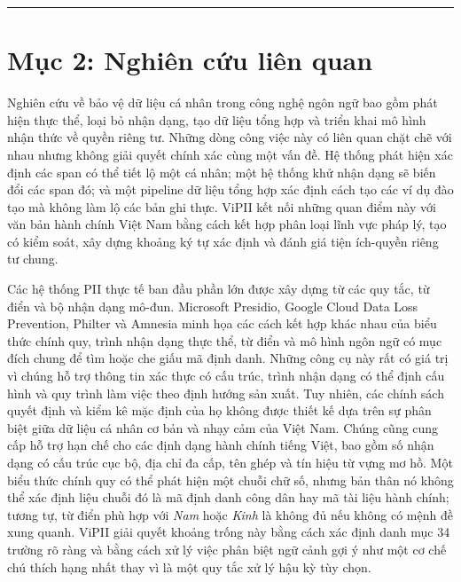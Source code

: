 \documentclass[
  11pt,
  a4paper,
]{article}
\begin{document}
\begin{center}\rule{0.5\linewidth}{0.5pt}\end{center}

\section{Mục 2: Nghiên cứu liên
quan}\label{mux1ee5c-2-nghiuxean-cux1ee9u-liuxean-quan}

Nghiên cứu về bảo vệ dữ liệu cá nhân trong công nghệ ngôn ngữ bao gồm
phát hiện thực thể, loại bỏ nhận dạng, tạo dữ liệu tổng hợp và triển
khai mô hình nhận thức về quyền riêng tư. Những dòng công việc này có
liên quan chặt chẽ với nhau nhưng không giải quyết chính xác cùng một
vấn đề. Hệ thống phát hiện xác định các span có thể tiết lộ một cá nhân;
một hệ thống khử nhận dạng sẽ biến đổi các span đó; và một pipeline dữ
liệu tổng hợp xác định cách tạo các ví dụ đào tạo mà không làm lộ các
bản ghi thực. ViPII kết nối những quan điểm này với văn bản hành chính
Việt Nam bằng cách kết hợp phân loại lĩnh vực pháp lý, tạo có kiểm soát,
xây dựng khoảng ký tự xác định và đánh giá tiện ích-quyền riêng tư
chung.

Các hệ thống PII thực tế ban đầu phần lớn được xây dựng từ các quy tắc,
từ điển và bộ nhận dạng mô-đun. Microsoft Presidio, Google Cloud Data
Loss Prevention, Philter và Amnesia minh họa các cách kết hợp khác nhau
của biểu thức chính quy, trình nhận dạng thực thể, từ điển và mô hình
ngôn ngữ có mục đích chung để tìm hoặc che giấu mã định danh. Những công
cụ này rất có giá trị vì chúng hỗ trợ thông tin xác thực có cấu trúc,
trình nhận dạng có thể định cấu hình và quy trình làm việc theo định
hướng sản xuất. Tuy nhiên, các chính sách quyết định và kiểm kê mặc định
của họ không được thiết kế dựa trên sự phân biệt giữa dữ liệu cá nhân cơ
bản và nhạy cảm của Việt Nam. Chúng cũng cung cấp hỗ trợ hạn chế cho các
định dạng hành chính tiếng Việt, bao gồm số nhận dạng có cấu trúc cục
bộ, địa chỉ đa cấp, tên ghép và tín hiệu từ vựng mơ hồ. Một biểu thức
chính quy có thể phát hiện một chuỗi chữ số, nhưng bản thân nó không thể
xác định liệu chuỗi đó là mã định danh công dân hay mã tài liệu hành
chính; tương tự, từ điển phù hợp với \emph{Nam} hoặc \emph{Kinh} là
không đủ nếu không có mệnh đề xung quanh. ViPII giải quyết khoảng trống
này bằng cách xác định danh mục 34 trường rõ ràng và bằng cách xử lý
việc phân biệt ngữ cảnh gợi ý như một cơ chế chú thích hạng nhất thay vì
là một quy tắc xử lý hậu kỳ tùy chọn.
\end{document}
